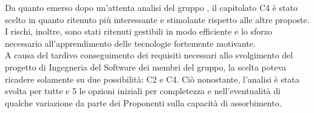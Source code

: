 Da quanto emerso dopo un'attenta analisi del gruppo \GRUPPO, il capitolato C4 è stato scelto in quanto ritenuto più interessante e stimolante rispetto alle altre proposte. I rischi, inoltre, sono stati ritenuti gestibili in modo efficiente e lo sforzo necessario all'apprendimento delle tecnologie fortemente motivante. \\ A causa del tardivo conseguimento dei requisiti necessari allo svolgimento del progetto di Ingegneria del Software dei membri del gruppo, la scelta poteva ricadere solamente su due possibilità: C2 e C4. Ciò nonostante, l'analisi è stata svolta per tutte e 5 le opzioni iniziali per completezza e nell'eventualità di qualche variazione da parte dei Proponenti sulla capacità di assorbimento.
